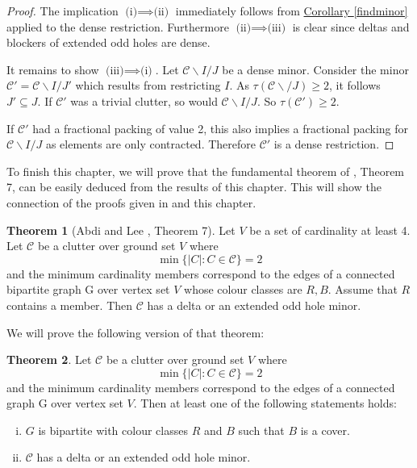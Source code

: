 \documentclass[a4paper, 12pt]{scrbook}
\theoremstyle{definition}
\newtheorem{theorem}{Theorem}[chapter]
\begin{document}
   \begin{proof}
       The implication $\text{(i)} \implies \text{(ii)}$ immediately follows from \hyperref[findminor]{Corollary \ref*{findminor}} applied to the dense restriction. Furthermore $\text{(ii)} \implies \text{(iii)}$ is clear since deltas and blockers of extended odd holes are dense.

       It remains to show $\text{(iii)} \implies \text{(i)}$. Let $\mathcal{C} \backslash I /J$ be a dense minor. Consider the minor $\mathcal{C'}=\mathcal{C}\backslash I/J'$ which results from restricting $I$. As $\tau(\mathcal{C}\backslash /J)\geq 2$, it follows $J' \subseteq J$. If $\mathcal{C'}$ was a trivial clutter, so would $\mathcal{C} \backslash I/J$. So $\tau(\mathcal{C'})\geq 2$.

       If $\mathcal{C'}$ had a fractional packing of value 2, this also implies a fractional packing for $\mathcal{C}\backslash I/J$ as elements are only contracted. Therefore $\mathcal{C'}$ is a dense restriction.
   \end{proof}

   To finish this chapter, we will prove that the fundamental theorem of \cite{deltas}, Theorem 7, can be easily deduced from the results of this chapter. This will show the connection of the proofs given in \cite{deltas} and this chapter.

   \begin{theorem}[Abdi and Lee \cite{deltas}, Theorem 7]
       Let $V$ be a set of cardinality at least 4. Let $\mathcal{C}$ be a clutter over ground set $V$ where
       \[
           \min\{|C|: C \in \mathcal{C}\} = 2
       \]
           and the minimum cardinality members correspond to the edges of a connected bipartite graph G over vertex set $V$ whose colour classes are $R,B$. Assume that $R$ contains a member. Then $\mathcal{C}$ has a delta or an extended odd hole minor.
   \end{theorem}

   We will prove the following version of that theorem:
   \begin{theorem}
       Let $\mathcal{C}$ be a clutter over ground set $V$ where
       \[
           \min\{|C|: C \in \mathcal{C}\} = 2
       \]
           and the minimum cardinality members correspond to the edges of a connected graph G over vertex set $V$.
           Then at least one of the following statements holds:
           \leavevmode
           \begin{enumerate}[(i)]
               \item $G$ is bipartite with colour classes $R$ and $B$ such that $B$ is a cover.
               \item $\mathcal{C}$ has a delta or an extended odd hole minor.
           \end{enumerate}
   \end{theorem}
\end{document}
